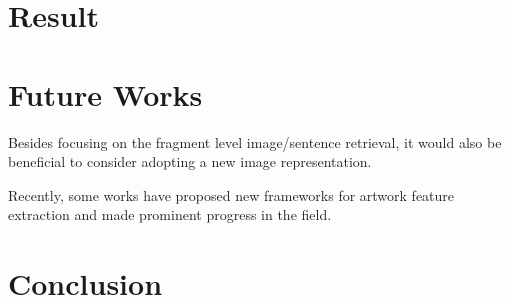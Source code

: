 \section{Result}


\section{Future Works}
Besides focusing on the fragment level image/sentence retrieval, it would also be beneficial to consider adopting a new image representation. 

Recently, some works \cite{TranslatingArtworks,parttowhole,Art2Real} have proposed new frameworks for artwork feature extraction and made prominent progress in the field. 


\section{Conclusion}


